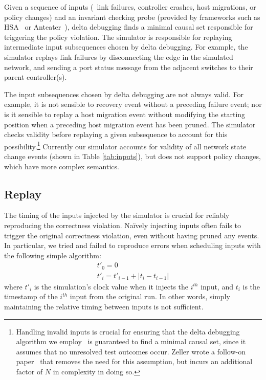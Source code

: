 Given a sequence of inputs (\eg~link failures, controller crashes, host migrations,
or policy changes) and an invariant checking probe (provided by frameworks
such as HSA~\cite{hsa,hsa_realtime} or Anteater~\cite{anteater,khurshid2012veriflow}),
delta debugging finds a minimal causal set responsible for triggering the
policy violation. The
simulator is responsible for replaying intermediate input subsequences
chosen by delta debugging. For example, the simulator replays link failures
by disconnecting the edge in the simulated network, and sending a
port status message from the adjacent switches to their parent controller(s).

The input subsequences chosen by delta debugging are not always valid. For
example, it is not sensible to recovery event without a
preceding failure event; nor is it sensible to replay a host migration
event without modifying the starting position when a preceding host
migration event has been pruned. The simulator checks
validity before replaying a given subsequence to account for this
possibility.\footnote{Handling invalid inputs is crucial for
ensuring that the delta debugging algorithm we employ~\cite{Zeller:1999:YMP:318773.318946}
is guaranteed to find a minimal causal set, since it assumes that no unresolved
test outcomes occur. Zeller wrote a follow-on
paper~\cite{Zeller:2002:SIF:506201.506206} that removes the need for this assumption,
but incurs an additional factor of $N$ in complexity in doing so.}
Currently our simulator accounts for validity of all network state change
events (shown in Table \ref{tab:inputs}), but does not support policy changes,
which have more complex semantics.

\subsection{Replay}
\label{subsec:replay}

The timing of the inputs injected by the simulator is crucial for reliably
reproducing the
correctness violation. Na\"ively injecting inputs often fails to
trigger the original correctness violation, even without having pruned any
events. In particular, we tried and failed to reproduce errors when scheduling inputs
with the following simple algorithm:
\begin{align*}
t'_0 = 0 \\
t'_i = t'_{i-1} + |t_{i} - t_{i-1}|
\end{align*}
where $t'_i$ is the simulation's clock value when it injects the $i^{th}$ input, and $t_i$ is
the timestamp of the $i^{th}$ input from the original run. In other words, simply
maintaining the relative timing between inputs is not sufficient.

